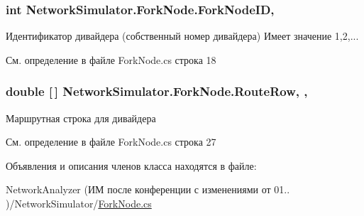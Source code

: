 \subsubsection[{\texorpdfstring{Fork\+Node\+ID}{ForkNodeID}}]{\setlength{\rightskip}{0pt plus 5cm}int Network\+Simulator.\+Fork\+Node.\+Fork\+Node\+ID\hspace{0.3cm}{\ttfamily [get]}, {}}\hypertarget{class_network_simulator_1_1_fork_node_a13432354bc104beb3ec98ba28d4966cb}{}\label{class_network_simulator_1_1_fork_node_a13432354bc104beb3ec98ba28d4966cb}


Идентификатор дивайдера (собственный номер дивайдера) Имеет значение 1,2,... 



См. определение в файле Fork\+Node.\+cs строка 18

\subsubsection[{\texorpdfstring{Route\+Row}{RouteRow}}]{\setlength{\rightskip}{0pt plus 5cm}double \mbox{[}$\,$\mbox{]} Network\+Simulator.\+Fork\+Node.\+Route\+Row\hspace{0.3cm}{\ttfamily [get]}, {\ttfamily [set]}, {\ttfamily [protected]}}\hypertarget{class_network_simulator_1_1_fork_node_afcdd23cd37381679ba4f364e0c5b1854}{}\label{class_network_simulator_1_1_fork_node_afcdd23cd37381679ba4f364e0c5b1854}


Маршрутная строка для дивайдера 



См. определение в файле Fork\+Node.\+cs строка 27



Объявления и описания членов класса находятся в файле\+:\begin{DoxyCompactItemize}
\item 
Network\+Analyzer (ИМ после конференции  с изменениями от 01.. )/\+Network\+Simulator/\hyperlink{_fork_node_8cs}{Fork\+Node.\+cs}\end{DoxyCompactItemize}
